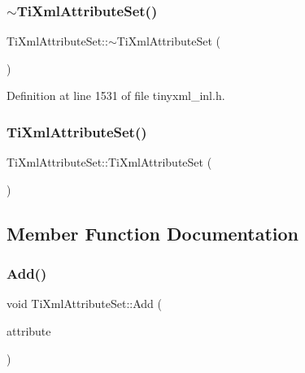 \subsubsection{\texorpdfstring{$\sim$\+Ti\+Xml\+Attribute\+Set()}{~TiXmlAttributeSet()}}
{\footnotesize\ttfamily Ti\+Xml\+Attribute\+Set\+::$\sim$\+Ti\+Xml\+Attribute\+Set (\begin{DoxyParamCaption}{ }\end{DoxyParamCaption})}



Definition at line 1531 of file tinyxml\+\_\+inl.\+h.

\hypertarget{class_ti_xml_attribute_set_acb244bc616c28b1c4b8e8417f28e5f9e}{}\label{class_ti_xml_attribute_set_acb244bc616c28b1c4b8e8417f28e5f9e} 
\subsubsection{\texorpdfstring{Ti\+Xml\+Attribute\+Set()}{TiXmlAttributeSet()}\hspace{0.1cm}{\footnotesize\ttfamily [2/2]}}
{\footnotesize\ttfamily Ti\+Xml\+Attribute\+Set\+::\+Ti\+Xml\+Attribute\+Set (\begin{DoxyParamCaption}\item[{const \hyperlink{class_ti_xml_attribute_set}{Ti\+Xml\+Attribute\+Set} \&}]{ }\end{DoxyParamCaption})\hspace{0.3cm}{\ttfamily [private]}}



\subsection{Member Function Documentation}
\hypertarget{class_ti_xml_attribute_set_a745e50ddaae3bee93e4589321e0b9c1a}{}\label{class_ti_xml_attribute_set_a745e50ddaae3bee93e4589321e0b9c1a} 
\subsubsection{\texorpdfstring{Add()}{Add()}}
{\footnotesize\ttfamily void Ti\+Xml\+Attribute\+Set\+::\+Add (\begin{DoxyParamCaption}\item[{\hyperlink{class_ti_xml_attribute}{Ti\+Xml\+Attribute} $\ast$}]{attribute }\end{DoxyParamCaption})}



